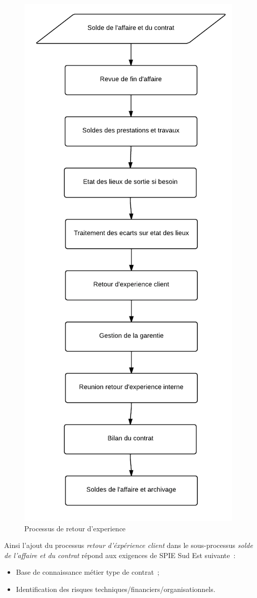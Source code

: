 \begin{figure}[h!]
	\centering
	\includegraphics[width=0.45\linewidth]{images/processus_retour_experience.png}
	\caption{Processus de retour d'experience}
	\label{fig:processusRetourExperience}
\end{figure}

Ainsi l'ajout du processus \textit{retour d'\'exp\'erience client} dans le sous-processus \textit{solde
de l'affaire et du contrat} r\'epond aux exigences de SPIE Sud Est suivante~:

\begin{itemize}
    \item Base de connaissance m\'etier type de contrat~;
    \item Identification des risques techniques/financiers/organisationnels.
\end{itemize}



